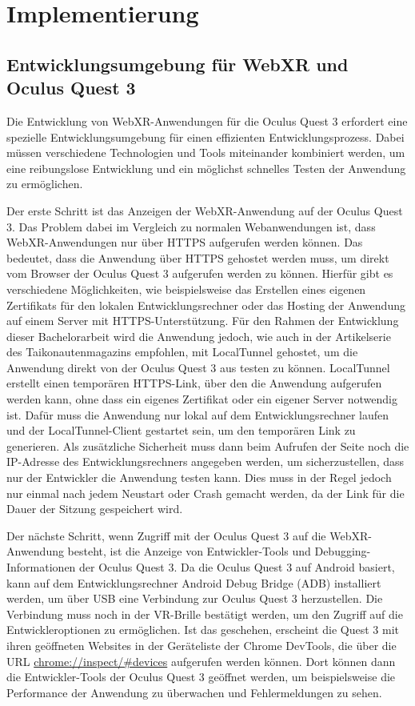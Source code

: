 \chapter{Implementierung}

\section{Entwicklungsumgebung für WebXR und Oculus Quest 3}

Die Entwicklung von WebXR-Anwendungen für die Oculus Quest 3 erfordert eine spezielle Entwicklungsumgebung für einen effizienten Entwicklungsprozess.
Dabei müssen verschiedene Technologien und Tools miteinander kombiniert werden, um eine reibungslose Entwicklung und ein möglichst schnelles Testen der Anwendung zu ermöglichen.

Der erste Schritt ist das Anzeigen der WebXR-Anwendung auf der Oculus Quest 3.
Das Problem dabei im Vergleich zu \glqq{} normalen\grqq{} Webanwendungen ist, dass WebXR-Anwendungen nur über HTTPS aufgerufen werden können.
Das bedeutet, dass die Anwendung über HTTPS gehostet werden muss, um direkt vom Browser der Oculus Quest 3 aufgerufen werden zu können.
Hierfür gibt es verschiedene Möglichkeiten, wie beispielsweise das Erstellen eines eigenen Zertifikats für den lokalen Entwicklungsrechner oder das Hosting der Anwendung auf einem Server mit HTTPS-Unterstützung.
Für den Rahmen der Entwicklung dieser Bachelorarbeit wird die Anwendung jedoch, wie auch in der Artikelserie des Taikonautenmagazins \autocite[Part 0/8]{taikonauten-magazine} empfohlen, mit LocalTunnel gehostet, um die Anwendung direkt von der Oculus Quest 3 aus testen zu können.
LocalTunnel erstellt einen temporären HTTPS-Link, über den die Anwendung aufgerufen werden kann, ohne dass ein eigenes Zertifikat oder ein eigener Server notwendig ist.
Dafür muss die Anwendung nur lokal auf dem Entwicklungsrechner laufen und der LocalTunnel-Client gestartet sein, um den temporären Link zu generieren.
Als zusätzliche Sicherheit muss dann beim Aufrufen der Seite noch die IP-Adresse des Entwicklungsrechners angegeben werden, um sicherzustellen, dass nur der Entwickler die Anwendung testen kann.
Dies muss in der Regel jedoch nur einmal nach jedem Neustart oder Crash gemacht werden, da der Link für die Dauer der Sitzung gespeichert wird.

Der nächste Schritt, wenn Zugriff mit der Oculus Quest 3 auf die WebXR-Anwendung besteht, ist die Anzeige von Entwickler-Tools und Debugging-Informationen der Oculus Quest 3.
Da die Oculus Quest 3 auf Android basiert, kann auf dem Entwicklungsrechner Android Debug Bridge (ADB) installiert werden, um über USB eine Verbindung zur Oculus Quest 3 herzustellen.
Die Verbindung muss noch in der VR-Brille bestätigt werden, um den Zugriff auf die Entwickleroptionen zu ermöglichen.
Ist das geschehen, erscheint die Quest 3 mit ihren geöffneten Websites in der Geräteliste der Chrome DevTools, die über die URL \url{chrome://inspect/#devices} aufgerufen werden können.
Dort können dann die Entwickler-Tools der Oculus Quest 3 geöffnet werden, um beispielsweise die Performance der Anwendung zu überwachen und Fehlermeldungen zu sehen.




